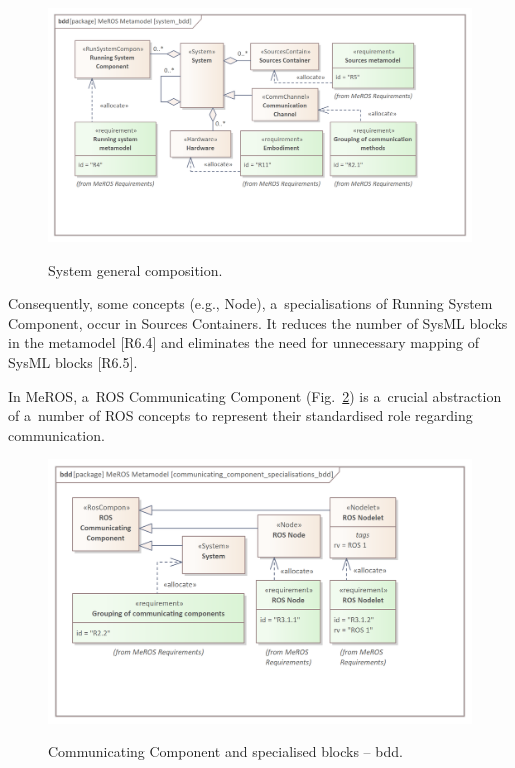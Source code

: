 \documentclass[11pt,oneside,a4paper]{report}
\begin{document}
		
	\begin{figure}[H]
		\centering
		\begin{center}
			{\includegraphics[scale=1.0]{img/meros_pkg/system_bdd.png}}
		\end{center}
		\caption{System general composition.} 
		\label{fig:ros_system_bdd}
	\end{figure}
	
	Consequently, some concepts (e.g., Node), a~specialisations of Running System Component, occur in Sources Containers. It reduces the number of SysML blocks in the metamodel [R6.4] and eliminates the need for unnecessary mapping of SysML blocks [R6.5].
		
	\pagebreak	
		
	In MeROS, a~ROS Communicating Component (Fig.~\ref{fig:communicating_components_bdd}) is a~crucial abstraction of a~number of ROS concepts to represent their standardised role regarding communication. 
	
		
	\begin{figure}[H]
		\centering
		\begin{center}
			{\includegraphics[scale=1.0]{img/meros_pkg/communicating_component_specialisations_bdd.png}}
		\end{center}
		\caption{Communicating Component and specialised blocks -- bdd.} 
		\label{fig:communicating_components_bdd}
	\end{figure}
	
\end{document}
